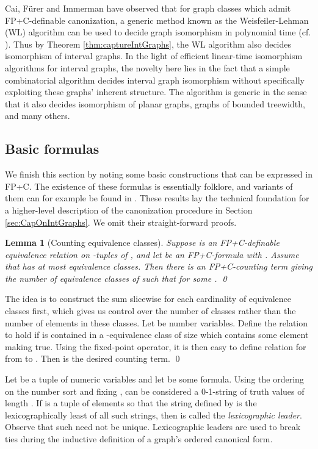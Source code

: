 \documentclass[10pt]{article}
\newtheorem{lem}[thm]{Lemma}
\theoremstyle{remark}
\theoremstyle{definition}
\theoremstyle{plain}
\newcommand{\logic}[1]{\textsf{\upshape\relsize{-0.5}#1}\xspace}
\newcommand{\FPC}{\logic{FP+C}}
\begin{document}
Cai, F\"urer and Immerman have observed that for graph classes which admit \FPC-definable canonization, a generic method known as the Weisfeiler-Lehman (WL) algorithm can be used to decide graph isomorphism in polynomial time (cf. \cite{cai92optimal}). Thus by Theorem \ref{thm:captureIntGraphs}, the WL algorithm also decides isomorphism of interval graphs. In the light of efficient linear-time isomorphism algorithms for interval graphs, the novelty here lies in the fact that a simple combinatorial algorithm decides interval graph isomorphism without specifically exploiting these graphs' inherent structure. The algorithm is generic in the sense that it also decides isomorphism of planar graphs, graphs of bounded treewidth, and many others.



\subsection{Basic formulas}

We finish this section by noting some basic constructions that can be expressed in \FPC. The existence of these formulas is essentially folklore, and variants of them can for example be found in \cite{graedel07finite}. These results lay the technical foundation for a higher-level description of the canonization procedure in Section \ref{sec:CapOnIntGraphs}. We omit their straight-forward proofs.

\begin{lem}[Counting equivalence classes] \label{lem:countEqClasses}
Suppose  is an \FPC-definable equivalence relation on -tuples of , and let  be an \FPC-formula with . Assume that  has at most  equivalence classes. Then there is an \FPC-counting term giving the number of equivalence classes  of  such that  for some . \qed
\end{lem}

\proof The idea is to construct the sum slicewise for each cardinality of equivalence classes first, which gives us control over the number of classes rather than the number of elements in these classes.  Let  be number variables. Define the relation  to hold if  is contained in a -equivalence class of size  which contains some element making  true. Using the fixed-point operator, it is then easy to define relation  for  from  to . Then  is the desired counting term. \qed

Let  be a tuple of numeric variables and let  be some formula. Using the ordering on the number sort and fixing ,  can be considered a 0-1-string of truth values of length . If  is a tuple of elements so that the string defined by  is the lexicographically least of all such strings, then  is called the \emph{lexicographic leader}. Observe that such  need not be unique. Lexicographic leaders are used to break ties during the inductive definition of a graph's ordered canonical form.
\end{document}
